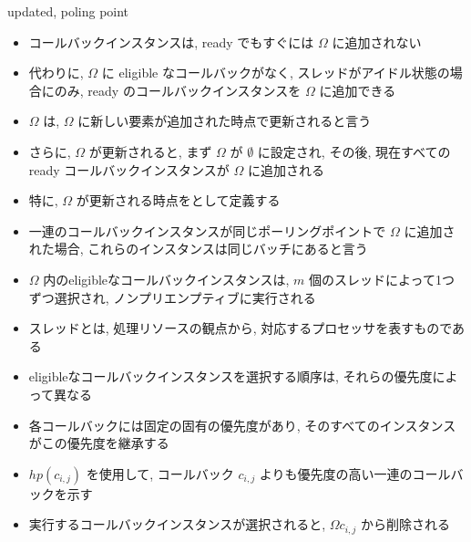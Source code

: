 \begin{frame}{updated, poling point}
    \begin{itemize}
        \item コールバックインスタンスは, ready でもすぐには $\Omega$ に追加されない
        \item 代わりに, $\Omega$ に eligible なコールバックがなく, スレッドがアイドル状態の場合にのみ, ready のコールバックインスタンスを $\Omega$ に追加できる
        \item $\Omega$ は, $\Omega$ に新しい要素が追加された時点で更新されると言う
        \item さらに, $\Omega$ が更新されると, まず $\Omega$ が $\emptyset$ に設定され, その後, 現在すべての ready コールバックインスタンスが $\Omega$ に追加される
        \item 特に, $\Omega$ が更新される時点をとして定義する
        \item 一連のコールバックインスタンスが同じポーリングポイントで $\Omega$ に追加された場合, これらのインスタンスは同じバッチにあると言う
    \end{itemize}
\end{frame}

\begin{frame}{}
    \begin{itemize}
        \item $\Omega$ 内のeligibleなコールバックインスタンスは, $m$ 個のスレッドによって1つずつ選択され, ノンプリエンプティブに実行される
        \item スレッドとは, 処理リソースの観点から, 対応するプロセッサを表すものである
    \end{itemize}
\end{frame}

\begin{frame}{}
    \begin{itemize}
        \item eligibleなコールバックインスタンスを選択する順序は, それらの優先度によって異なる
        \item 各コールバックには固定の固有の優先度があり, そのすべてのインスタンスがこの優先度を継承する
        \item $h p\left(c_{i, j}\right)$ を使用して, コールバック $c_{i, j}$ よりも優先度の高い一連のコールバックを示す
        \item 実行するコールバックインスタンスが選択されると, $\Omega  c_{i, j}$ から削除される
    \end{itemize}
\end{frame}

